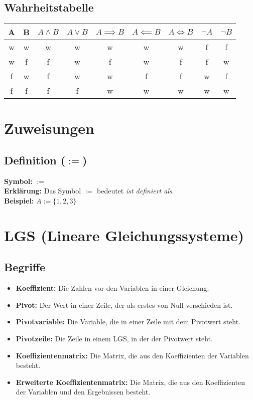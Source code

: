 \documentclass[12pt,a4paper]{article}
\begin{document}
\subsection{Wahrheitstabelle}
\begin{tabular}{|c|c|c|c|c|c|c|c|c|}
    \hline
    A & B & $A \land B$ & $A \lor B$ & $A \implies B$ & $A \impliedby B$ & $A \iff B$ & $\neg A$ & $\neg B$ \\
    \hline
    w & w & w & w & w & w & w & f & f \\
    \hdashline
    w & f & f & w & f & w & f & f & w \\
    \hdashline
    f & w & f & w & w & f & f & w & f \\
    \hdashline
    f & f & f & f & w & w & w & w & w \\
    \hline
\end{tabular}

\section{Zuweisungen}

\subsection{Definition (\texorpdfstring{$:=$}{:=})}
\textbf{Symbol:} $:=$ \\
\textbf{Erklärung:} Das Symbol $:=$ bedeutet \textit{ist definiert als}. \\
\textbf{Beispiel:} $A := \{1,2,3\}$


\newpage
\section{LGS (Lineare Gleichungssysteme)}
\subsection{Begriffe}
\begin{itemize}
    \item \textbf{Koeffizient:} Die Zahlen vor den Variablen in einer Gleichung.
    \item \textbf{Pivot:} Der Wert in einer Zeile, der als erstes von Null verschieden ist.
    \item \textbf{Pivotvariable:} Die Variable, die in einer Zeile mit dem Pivotwert steht.
    \item \textbf{Pivotzeile:} Die Zeile in einem LGS, in der der Pivotwert steht.
    \item \textbf{Koeffizientenmatrix:} Die Matrix, die aus den Koeffizienten der Variablen besteht.
    \item \textbf{Erweiterte Koeffizientenmatrix:} Die Matrix, die aus den Koeffizienten der Variablen und den Ergebnissen besteht.
\end{itemize}
\end{document}
